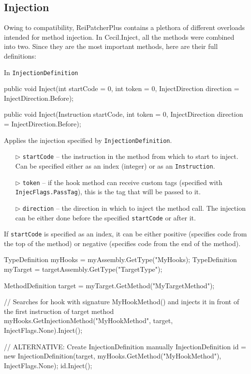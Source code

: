 \documentclass[a4paper,11pt]{article}
\newcommand{\CecilInject}{\textsc{C}{\scriptsize \sc ecil}.\textsc{I}{\scriptsize \sc nject}}
\begin{document}
\subsection{Injection}
Owing to compatibility, ReiPatcherPlus contains a plethora of different overloads intended for method injection. In \CecilInject{}, all the methods were combined into two.
Since they are the most important methods, here are their full definitions:
\begin{mdef}
In \texttt{InjectionDefinition}
\begin{cs}
public void Inject(int startCode = 0,
                   int token = 0, 
                   InjectDirection direction = InjectDirection.Before);
                   
public void Inject(Instruction startCode, 
                   int token = 0, 
                   InjectDirection direction = InjectDirection.Before);
\end{cs}

Applies the injection specified by \texttt{InjectionDefinition}.

\begin{itemize}
\item[$\triangleright$] \texttt{startCode} -- the instruction in the method from which to start to inject. Can be specified either as an index (integer) or as an \texttt{Instruction}.
\item[$\triangleright$] \texttt{token} -- if the hook method can receive custom tags (specified with \texttt{InjecFlags.PassTag}), this is the tag that will be passed to it.
\item[$\triangleright$] \texttt{direction} -- the direction in which to inject the method call. The injection can be either done before the specified \texttt{startCode} or after it.
\end{itemize}

\phantom{a}
If \texttt{startCode} is specified as an index, it can be either positive (specifies code from the top of the method) or negative (specifies code from the end of the method).

\begin{cs}
TypeDefinition myHooks = myAssembly.GetType("MyHooks);
TypeDefinition myTarget = targetAssembly.GetType("TargetType");

MethodDefinition target = myTarget.GetMethod("MyTargetMethod");

// Searches for hook with signature MyHookMethod() and injects it in front of the first instruction of target method
myHooks.GetInjectionMethod("MyHookMethod", 
                           target, 
                           InjectFlags.None).Inject();
                           
// ALTERNATIVE: Create InjectionDefinition manually
InjectionDefinition id = 
     new InjectionDefinition(target,
                             myHooks.GetMethod("MyHookMethod"),
                             InjectFlags.None);
id.Inject();                                     
\end{cs}
\end{mdef}
\end{document}
